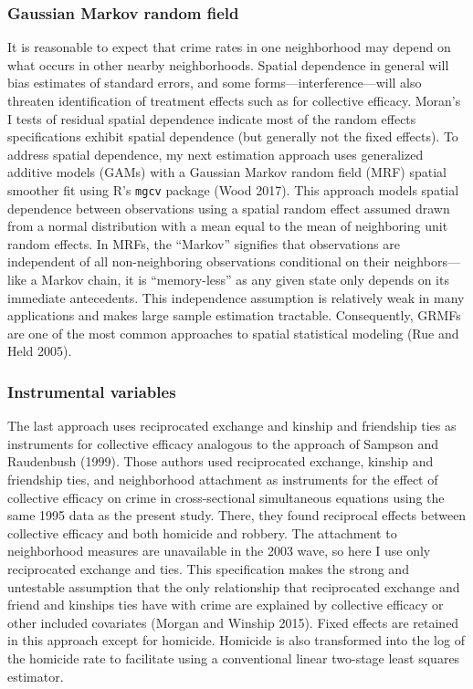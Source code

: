 \documentclass [11pt, proquest] {uwthesis}[2015/03/03]
\begin{document}
\hypertarget{gaussian-markov-random-field}{%
\subsubsection{Gaussian Markov random field}\label{gaussian-markov-random-field}}

It is reasonable to expect that crime rates in one neighborhood may depend on what occurs in other nearby neighborhoods. Spatial dependence in general will bias estimates of standard errors, and some forms---interference---will also threaten identification of treatment effects such as for collective efficacy. Moran's I tests of residual spatial dependence indicate most of the random effects specifications exhibit spatial dependence (but generally not the fixed effects). To address spatial dependence, my next estimation approach uses generalized additive models (GAMs) with a Gaussian Markov random field (MRF) spatial smoother fit using R's \texttt{mgcv} package (Wood 2017). This approach models spatial dependence between observations using a spatial random effect assumed drawn from a normal distribution with a mean equal to the mean of neighboring unit random effects. In MRFs, the ``Markov'' signifies that observations are independent of all non-neighboring observations conditional on their neighbors---like a Markov chain, it is ``memory-less'' as any given state only depends on its immediate antecedents. This independence assumption is relatively weak in many applications and makes large sample estimation tractable. Consequently, GRMFs are one of the most common approaches to spatial statistical modeling (Rue and Held 2005).

\hypertarget{instrumental-variables}{%
\subsubsection{Instrumental variables}\label{instrumental-variables}}

The last approach uses reciprocated exchange and kinship and friendship ties as instruments for collective efficacy analogous to the approach of Sampson and Raudenbush (1999). Those authors used reciprocated exchange, kinship and friendship ties, and neighborhood attachment as instruments for the effect of collective efficacy on crime in cross-sectional simultaneous equations using the same 1995 data as the present study. There, they found reciprocal effects between collective efficacy and both homicide and robbery. The attachment to neighborhood measures are unavailable in the 2003 wave, so here I use only reciprocated exchange and ties. This specification makes the strong and untestable assumption that the only relationship that reciprocated exchange and friend and kinships ties have with crime are explained by collective efficacy or other included covariates (Morgan and Winship 2015). Fixed effects are retained in this approach except for homicide. Homicide is also transformed into the log of the homicide rate to facilitate using a conventional linear two-stage least squares estimator.
\end{document}

